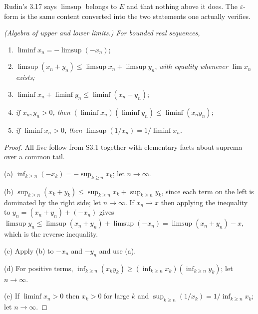 \noindent
Rudin's 3.17 says $\limsup$ belongs to $E$ and that nothing above it does.
The $\varepsilon$-form is the same content converted into the two statements
one actually verifies.

\emph{(Algebra of upper and lower limits.) For bounded real sequences,}
\begin{enumerate}[label=(\alph*), leftmargin=2.2em, itemsep=2pt, topsep=3pt]
  \item $\liminf x_n = -\limsup(-x_n)$;
  \item $\limsup(x_n+y_n) \le \limsup x_n + \limsup y_n$, \emph{with
        equality whenever $\lim x_n$ exists;}
  \item $\liminf x_n + \liminf y_n \le \liminf(x_n+y_n)$;
  \item \emph{if $x_n, y_n > 0$, then}
        $(\liminf x_n)(\liminf y_n) \le \liminf(x_ny_n)$;
  \item \emph{if $\liminf x_n > 0$, then}
        $\limsup(1/x_n) = 1/\liminf x_n$.
\end{enumerate}
\begin{proof}
All five follow from S3.1 together with elementary facts about suprema over a
common tail.

(a) $\inf_{k\ge n}(-x_k) = -\sup_{k \ge n} x_k$; let $n \to \infty$.

(b) $\sup_{k\ge n}(x_k+y_k) \le \sup_{k\ge n}x_k + \sup_{k\ge n}y_k$, since
each term on the left is dominated by the right side; let $n \to \infty$. If
$x_n \to x$ then applying the inequality to $y_n = (x_n+y_n) + (-x_n)$ gives
$\limsup y_n \le \limsup(x_n+y_n) + \limsup(-x_n) = \limsup(x_n+y_n) - x$,
which is the reverse inequality.

(c) Apply (b) to $-x_n$ and $-y_n$ and use (a).

(d) For positive terms, $\inf_{k\ge n}(x_ky_k) \ge
(\inf_{k\ge n}x_k)(\inf_{k\ge n}y_k)$; let $n\to\infty$.

(e) If $\liminf x_n > 0$ then $x_k > 0$ for large $k$ and
$\sup_{k\ge n}(1/x_k) = 1/\inf_{k\ge n}x_k$; let $n \to \infty$.
\end{proof}


